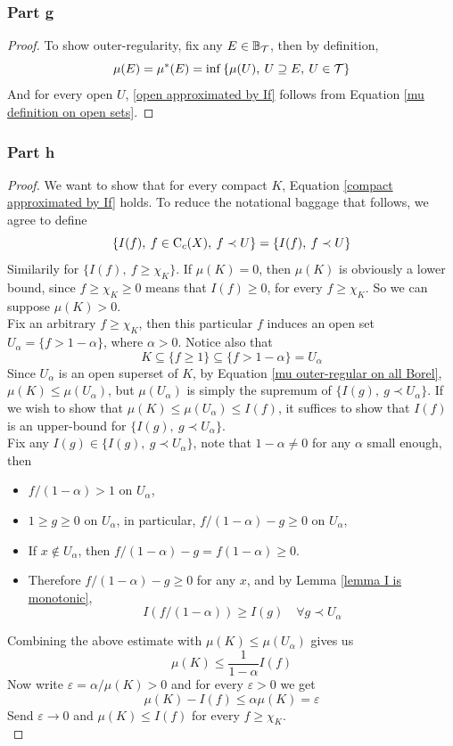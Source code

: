 \documentclass[../../main.tex]{subfiles}
\begin{document}
\subsubsection{Part g}
\begin{proof}
    To show outer-regularity, fix any $E\in\mathbb{B}_{\mathcal{T}}$, then by definition,
    \[
    \mu(E) =\mu^*(E)= \inf\left\{\mu(U),\:U\supseteq E,\:U\in\mathcal{T}\right\}
    \]
    And for every open $U$, \eqref{open approximated by If} follows from Equation \eqref{mu definition on open sets}.
\end{proof}
\subsubsection{Part h}
\begin{proof}
We want to show that for every compact $K$, Equation \eqref{compact approximated by If} holds. To reduce the notational baggage that follows, we agree to define
\[
\left\{I(f),\: f\in\operatorname{C}_c({X}),\:f\prec U\right\} = \{I(f),\: f\prec U\}
\]
Similarily for $\{I(f),\: f\geq \chi_K\}$. If $\mu(K)=0$, then $\mu(K)$ is obviously a lower bound, since $f\geq \chi_K\geq 0$ means that $I(f)\geq 0$, for every $f\geq \chi_K$. So we can suppose $\mu(K)>0$.\\

Fix an arbitrary $f\geq \chi_K$, then this particular $f$ induces an open set $U_\alpha=\{f>1-\alpha\}$, where $\alpha>0$. Notice also that
\[
K\subseteq\{f\geq 1\}\subseteq \{f>1-\alpha\}=U_\alpha
\]
Since $U_\alpha$ is an open superset of $K$, by Equation \eqref{mu outer-regular on all Borel}, $\mu(K)\leq \mu(U_\alpha)$, but $\mu(U_\alpha)$ is simply the supremum of $\{I(g),\:g\prec U_\alpha\}$. If we wish to show that $\mu(K)\leq \mu(U_\alpha)\leq I(f)$, it suffices to show that $I(f)$ is an upper-bound for $\{I(g),\:g\prec U_\alpha\}$.\\

Fix any $I(g)\in\{I(g),\:g\prec U_\alpha\}$, note that $1-\alpha\neq 0$ for any $\alpha$ small enough, then 
\begin{itemize}
    \item $f/(1-\alpha)>1$ on $U_\alpha$,
    \item $1\geq g\geq 0$ on $U_\alpha$, in particular, $f/(1-\alpha)-g\geq 0$ on $U_\alpha$,
    \item If $x\notin U_\alpha$, then $f/(1-\alpha)-g = f(1-\alpha)\geq 0$.
    \item Therefore $f/(1-\alpha)-g\geq 0$ for any $x$, and by Lemma \ref{lemma I is monotonic},
    \[
    I(f/(1-\alpha))\geq I(g)\quad\forall g\prec U_\alpha
    \]
\end{itemize}
Combining the above estimate with $\mu(K)\leq \mu(U_\alpha)$ gives us
\[
\mu(K)\leq \dfrac{1}{1-\alpha}I(f)
\]
Now write $\varepsilon = \alpha/\mu(K)>0$ and for every $\varepsilon>0$ we get
\[
\mu(K)-I(f)\leq\alpha\mu(K)=\varepsilon
\]
Send $\varepsilon\to 0$ and $\mu(K)\leq I(f)$ for every $f\geq\chi_K$.\\ 


\end{proof}
\end{document}
